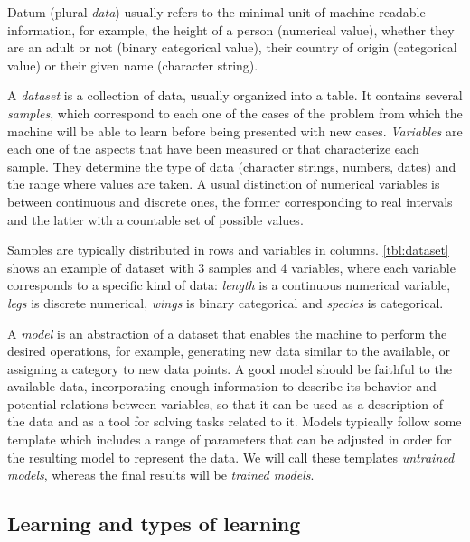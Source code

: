 Datum (plural \textit{data}) usually refers to the minimal unit of machine-readable information, for example, the height of a person (numerical value), whether they are an adult or not (binary categorical value), their country of origin (categorical value) or their given name (character string).

A \textit{dataset} is a collection of data, usually organized into a table. It contains several \textit{samples}, which correspond to each one of the cases of the problem from which the machine will be able to learn before being presented with new cases. \textit{Variables} are each one of the aspects that have been measured or that characterize each sample. They determine the type of data (character strings, numbers, dates) and the range where values are taken. A usual distinction of numerical variables is between continuous and discrete ones, the former corresponding to real intervals and the latter with a countable set of possible values. 

Samples are typically distributed in rows and variables in columns. \autoref{tbl:dataset} shows an example of dataset with 3 samples and 4 variables, where each variable corresponds to a specific kind of data: \textit{length} is a continuous numerical variable, \textit{legs} is discrete numerical, \textit{wings} is binary categorical and \textit{species} is categorical.


A \textit{model} is an abstraction of a dataset that enables the machine to perform the desired operations, for example, generating new data similar to the available, or assigning a category to new data points. A good model should be faithful to the available data, incorporating enough information to describe its behavior and potential relations between variables, so that it can be used as a description of the data and as a tool for solving tasks related to it. Models typically follow some template which includes a range of parameters that can be adjusted in order for the resulting model to represent the data. We will call these templates \textit{untrained models}, whereas the final results will be \textit{trained models}.



\subsection{Learning and types of learning}

